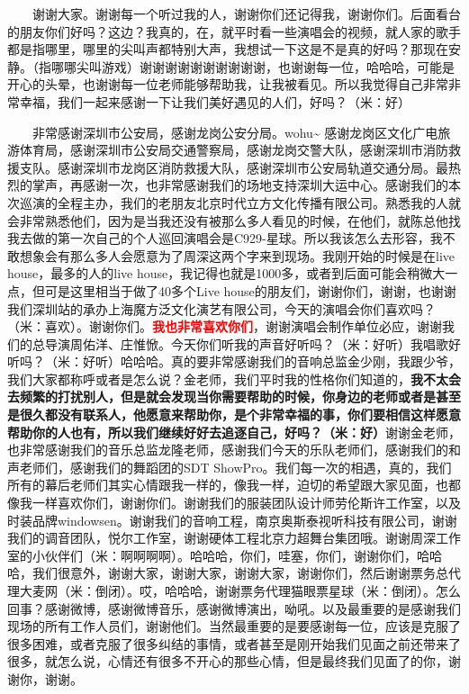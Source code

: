 \documentclass[]{ctexbook}
\begin{document}
  谢谢大家。谢谢每一个听过我的人，谢谢你们还记得我，谢谢你们。后面看台的朋友你们好吗？这边？我真的，在，就平时看一些演唱会的视频，就人家的歌手都是指哪里，哪里的尖叫声都特别大声，我想试一下这是不是真的好吗？那现在安静。（指哪哪尖叫游戏）谢谢谢谢谢谢谢谢谢谢，也谢谢每一位，哈哈哈，可能是开心的头晕，也谢谢每一位老师能够帮助我，让我被看见。所以我觉得自己非常非常幸福，我们一起来感谢一下让我们美好遇见的人们，好吗？（米：好）

  非常感谢深圳市公安局，感谢龙岗公安分局。wohu\textasciitilde{} 感谢龙岗区文化广电旅游体育局，感谢深圳市公安局交通警察局，感谢龙岗交警大队，感谢深圳市消防救援支队。感谢深圳市龙岗区消防救援大队，感谢深圳市公安局轨道交通分局。最热烈的掌声，再感谢一次，也非常感谢我们的场地支持深圳大运中心。感谢我们的本次巡演的全程主办，我们的老朋友北京时代立方文化传播有限公司。熟悉我的人就会非常熟悉他们，因为是当我还没有被那么多人看见的时候，在他们，就陈总他找我去做的第一次自己的个人巡回演唱会是C929-星球。所以我该怎么去形容，我不敢想象会有那么多人会愿意为了周深这两个字来到现场。我刚开始的时候是在live house，最多的人的live house，我记得也就是1000多，或者到后面可能会稍微大一点，但可是这里相当于做了40多个Live house的朋友们，谢谢你们，谢谢，也谢谢我们深圳站的承办上海魔方泛文化演艺有限公司，今天的演唱会你们喜欢吗？（米：喜欢）。谢谢你们。\textbf{\textcolor{red}{我也非常喜欢你们}}，谢谢演唱会制作单位必应，谢谢我们的总导演周佑洋、庄惟惞。今天你们听我的声音好听吗？（米：好听）我唱歌好听吗？（米：好听）哈哈哈。真的要非常感谢我们的音响总监金少刚，我跟少爷，我们大家都称呼或者是怎么说？金老师，我们平时我的性格你们知道的，\textbf{我不太会去频繁的打扰别人，但是就会发现当你需要帮助的时候，你身边的老师或者是甚至是很久都没有联系人，他愿意来帮助你，是个非常幸福的事，你们要相信这样愿意帮助你的人也有，所以我们继续好好去追逐自己，好吗？（米：好）}谢谢金老师，也非常感谢我们的音乐总监龙隆老师，感谢我们今天的乐队老师们，感谢我们的和声老师们，感谢我们的舞蹈团的SDT ShowPro。我们每一次的相遇，真的，我们所有的幕后老师们其实心情跟我一样的，像我一样，迫切的希望跟大家见面，也都像我一样喜欢你们，谢谢你们。谢谢我们的服装团队设计师劳伦斯许工作室，以及时装品牌windowsen。谢谢我们的音响工程，南京奥斯泰视听科技有限公司，谢谢我们的调音团队，悦尔工作室，谢谢硬体工程北京力超舞台集团哦。谢谢周深工作室的小伙伴们（米：啊啊啊啊）。哈哈哈，你们，哇塞，你们，谢谢你们，哈哈哈，我们很意外，谢谢大家，谢谢大家，谢谢大家，谢谢你们，然后谢谢票务总代理大麦网（米：倒闭）。哎，哈哈哈，谢谢票务代理猫眼票星球（米：倒闭）。怎么回事？感谢微博，感谢微博音乐，感谢微博演出，呦吼。以及最重要的是感谢我们现场的所有工作人员们，谢谢他们。当然最重要的是要感谢每一位，应该是克服了很多困难，或者克服了很多纠结的事情，或者甚至是刚开始我们见面之前还带来了很多，就怎么说，心情还有很多不开心的那些心情，但是最终我们见面了的你，谢谢你，谢谢。
\end{document}
